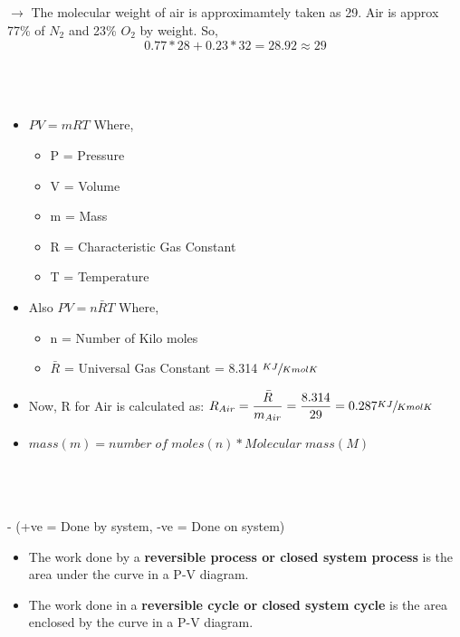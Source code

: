 \documentclass[8pt]{article}
\begin{document}
\begin{center}
\subsection*{}
\end{center}
$\rightarrow$ The molecular weight of air is approximamtely taken as 29. Air is approx 77\% of $N_2$ and 23\% $O_2$ by weight. So,
$$\boxed{0.77 * 28 + 0.23 * 32 = 28.92 \approx 29}$$\\
\\\\
	\begin{itemize}
		\item $PV = mRT$ Where,
		\begin{itemize}
			\item P = Pressure
			\item V = Volume 
			\item m = Mass 
			\item R = Characteristic Gas Constant
			\item T = Temperature
		\end{itemize}
		\item Also $PV = n\bar{R}T$ Where,
		\begin{itemize}
			\item n = Number of Kilo moles
			\item $\bar{R}$ = Universal Gas Constant = 8.314 $\sfrac{KJ}{Kmol K}$			
		\end{itemize}
		\item Now, R for Air is calculated as: $R_{Air} = \dfrac{\bar{R}}{m_{Air}} = \dfrac{8.314}{29} = 0.287 \sfrac{KJ}{Kmol K}$
		\item $\boxed{mass(m) = number\;of\;moles(n) * Molecular\;mass(M)}$\\
	\end{itemize}\hrulefill\\\\
\\ - (+ve = Done by system, -ve = Done on system)
	\begin{itemize}
		\item The work done by a \textbf{reversible process or closed system process} is the area under the curve in a P-V diagram.
		\item The work done in a \textbf{reversible cycle or closed system cycle}    is the area enclosed by the curve in a P-V diagram.
	\end{itemize}
\end{document}
